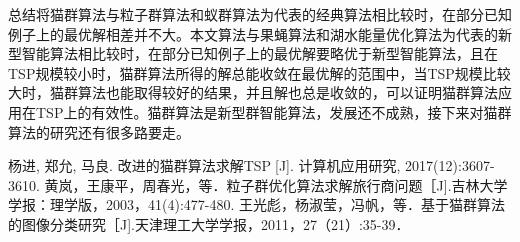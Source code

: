 \documentclass[UTF8]{ctexart}
\begin{document}
\begin{section}
{总结}将猫群算法与粒子群算法和蚁群算法为代表的经典算法相比较时，在部分已知例子上的最优解相差并不大。本文算法与果蝇算法和湖水能量优化算法为代表的新型智能算法相比较时，在部分已知例子上的最优解要略优于新型智能算法，且在TSP规模较小时，猫群算法所得的解总能收敛在最优解的范围中，当TSP规模比较大时，猫群算法也能取得较好的结果，并且解也总是收敛的，可以证明猫群算法应
用在TSP上的有效性。猫群算法是新型群智能算法，发展还不成熟，接下来对猫群算法的研究还有很多路要走。
\\ \indent
\end{section}
\newpage
\begin{thebibliography}{123} 
 杨进, 郑允, 马良. 改进的猫群算法求解TSP[J]. 计算机应用研究, 2017(12):3607-3610.
 黄岚，王康平，周春光，等．粒子群优化算法求解旅行商问题［J].吉林大学学报：理学版，2003，41(4):477-480.
王光彪，杨淑莹，冯帆，等．基于猫群算法的图像分类研究［J].天津理工大学学报，2011，27（21）:35-39．
\end{thebibliography}
\end{document}
